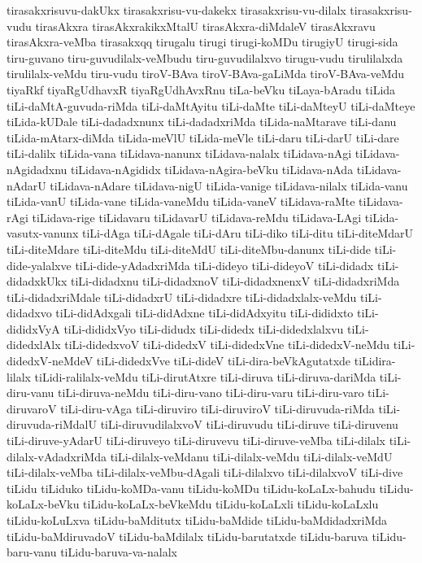 {tirasakxrisuvu-dakUkx
tirasakxrisu-vu-dakekx
tirasakxrisu-vu-dilalx
tirasakxrisu-vudu
tirasAkxra
tirasAkxrakikxMtalU
tirasAkxra-diMdaleV
tirasAkxravu
tirasAkxra-veMba
tirasakxqq
tirugalu
tirugi
tirugi-koMDu
tirugiyU
tirugi-sida
tiru-guvano
tiru-guvudilalx-veMbudu
tiru-guvudilalxvo
tirugu-vudu
tirulilalxda
tirulilalx-veMdu
tiru-vudu
tiroV-BAva
tiroV-BAva-gaLiMda
tiroV-BAva-veMdu
tiyaRkf
tiyaRgUdhavxR
tiyaRgUdhAvxRnu
tiLa-beVku
tiLaya-bAradu
tiLida
tiLi-daMtA-guvuda-riMda
tiLi-daMtAyitu
tiLi-daMte
tiLi-daMteyU
tiLi-daMteye
tiLida-kUDale
tiLi-dadadxnunx
tiLi-dadadxriMda
tiLida-naMtarave
tiLi-danu
tiLida-mAtarx-diMda
tiLida-meVlU
tiLida-meVle
tiLi-daru
tiLi-darU
tiLi-dare
tiLi-dalilx
tiLida-vana
tiLidava-nanunx
tiLidava-nalalx
tiLidava-nAgi
tiLidava-nAgidadxnu
tiLidava-nAgididx
tiLidava-nAgira-beVku
tiLidava-nAda
tiLidava-nAdarU
tiLidava-nAdare
tiLidava-nigU
tiLida-vanige
tiLidava-nilalx
tiLida-vanu
tiLida-vanU
tiLida-vane
tiLida-vaneMdu
tiLida-vaneV
tiLidava-raMte
tiLidava-rAgi
tiLidava-rige
tiLidavaru
tiLidavarU
tiLidava-reMdu
tiLidava-LAgi
tiLida-vasutx-vanunx
tiLi-dAga
tiLi-dAgale
tiLi-dAru
tiLi-diko
tiLi-ditu
tiLi-diteMdarU
tiLi-diteMdare
tiLi-diteMdu
tiLi-diteMdU
tiLi-diteMbu-danunx
tiLi-dide
tiLi-dide-yalalxve
tiLi-dide-yAdadxriMda
tiLi-dideyo
tiLi-dideyoV
tiLi-didadx
tiLi-didadxkUkx
tiLi-didadxnu
tiLi-didadxnoV
tiLi-didadxnenxV
tiLi-didadxriMda
tiLi-didadxriMdale
tiLi-didadxrU
tiLi-didadxre
tiLi-didadxlalx-veMdu
tiLi-didadxvo
tiLi-didAdxgali
tiLi-didAdxne
tiLi-didAdxyitu
tiLi-dididxto
tiLi-dididxVyA
tiLi-dididxVyo
tiLi-didudx
tiLi-didedx
tiLi-didedxlalxvu
tiLi-didedxlAlx
tiLi-didedxvoV
tiLi-didedxV
tiLi-didedxVne
tiLi-didedxV-neMdu
tiLi-didedxV-neMdeV
tiLi-didedxVve
tiLi-dideV
tiLi-dira-beVkAgutatxde
tiLidira-lilalx
tiLidi-ralilalx-veMdu
tiLi-dirutAtxre
tiLi-diruva
tiLi-diruva-dariMda
tiLi-diru-vanu
tiLi-diruva-neMdu
tiLi-diru-vano
tiLi-diru-varu
tiLi-diru-varo
tiLi-diruvaroV
tiLi-diru-vAga
tiLi-diruviro
tiLi-diruviroV
tiLi-diruvuda-riMda
tiLi-diruvuda-riMdalU
tiLi-diruvudilalxvoV
tiLi-diruvudu
tiLi-diruve
tiLi-diruvenu
tiLi-diruve-yAdarU
tiLi-diruveyo
tiLi-diruvevu
tiLi-diruve-veMba
tiLi-dilalx
tiLi-dilalx-vAdadxriMda
tiLi-dilalx-veMdanu
tiLi-dilalx-veMdu
tiLi-dilalx-veMdU
tiLi-dilalx-veMba
tiLi-dilalx-veMbu-dAgali
tiLi-dilalxvo
tiLi-dilalxvoV
tiLi-dive
tiLidu
tiLiduko
tiLidu-koMDa-vanu
tiLidu-koMDu
tiLidu-koLaLx-bahudu
tiLidu-koLaLx-beVku
tiLidu-koLaLx-beVkeMdu
tiLidu-koLaLxli
tiLidu-koLaLxlu
tiLidu-koLuLxva
tiLidu-baMditutx
tiLidu-baMdide
tiLidu-baMdidadxriMda
tiLidu-baMdiruvadoV
tiLidu-baMdilalx
tiLidu-barutatxde
tiLidu-baruva
tiLidu-baru-vanu
tiLidu-baruva-va-nalalx
}
